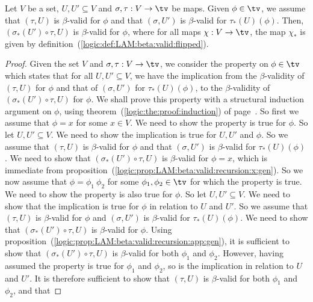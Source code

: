 \begin{prop}\label{logic:prop:LAM:beta:valid:composition:gen}
    Let $V$ be a set, $U,U'\subseteq V$ and $\sigma,\tau:V\to\tv$ be maps.
    Given $\phi\in\tv$, we assume that $(\tau,U)$ is $\beta$-valid for $\phi$
    and that $(\sigma,U')$ is $\beta$-valid for $\tau_{*}(U)(\phi)$.
    Then, $(\sigma_{*}(U')\circ\tau,U)$ is $\beta$-valid for $\phi$,
    where for all maps $\chi:V\to\tv$, the map $\chi_{*}$ is given by
    definition~(\ref{logic:def:LAM:beta:valid:flipped}).
\end{prop}
\begin{proof}
    Given the set $V$ and $\sigma,\tau:V\to\tv$, we consider the property on 
    $\phi\in\tv$ which states that for all $U,U'\subseteq V$, we have the
    implication from the $\beta$-validity of $(\tau,U)$ for $\phi$ and 
    that of $(\sigma,U')$ for $\tau_{*}(U)(\phi)$, to the $\beta$-validity
    of $(\sigma_{*}(U')\circ\tau,U)$ for $\phi$. We shall prove this property
    with a structural induction argument on $\phi$, using
    theorem~(\ref{logic:the:proof:induction}) of 
    page~\pageref{logic:the:proof:induction}. So first we assume that $\phi=x$
    for some $x\in V$. We need to show the property is true for $\phi$. So
    let $U,U'\subseteq V$. We need to show the implication is true for $U,U'$
    and $\phi$. So we assume that $(\tau,U)$ is $\beta$-valid for $\phi$ and
    that $(\sigma,U')$ is $\beta$-valid for $\tau_{*}(U)(\phi)$. We need to 
    show that $(\sigma_{*}(U')\circ\tau,U)$ is $\beta$-valid for $\phi=x$,
    which is immediate from 
    proposition~(\ref{logic:prop:LAM:beta:valid:recursion:x:gen}). So we
    now assume that $\phi=\phi_{1}\ \phi_{2}$ for some $\phi_{1},\phi_{2}\in\tv$
    for which the property is true. We need to show the property is also true
    for $\phi$. So let $U,U'\subseteq V$. We need to show that the implication
    is true for $\phi$ in relation to $U$ and $U'$. So we assume that
    $(\tau,U)$ is $\beta$-valid for $\phi$ and $(\sigma,U')$ is $\beta$-valid
    for $\tau_{*}(U)(\phi)$. We need to show that $(\sigma_{*}(U')\circ\tau,U)$
    is $\beta$-valid for $\phi$. Using
    proposition~(\ref{logic:prop:LAM:beta:valid:recursion:app:gen}), it is
    sufficient to show that $(\sigma_{*}(U')\circ\tau,U)$ is $\beta$-valid
    for both $\phi_{1}$ and $\phi_{2}$. However, having assumed the property
    is true for $\phi_{1}$ and $\phi_{2}$, so is the implication in relation
    to $U$ and $U'$. It is therefore sufficient to show that $(\tau,U)$ is
    $\beta$-valid for both $\phi_{1}$ and $\phi_{2}$, and that 

\end{proof}
